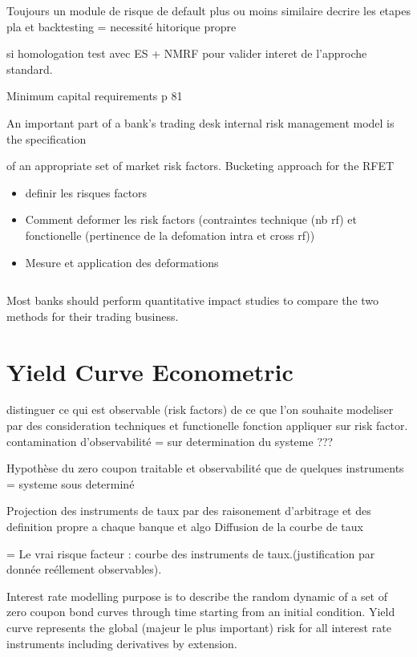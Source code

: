 \documentclass[3pt]{article}
\begin{document}
\bigskip

Toujours un module de risque de default plus ou moins similaire decrire les
etapes pla et backtesting =\TEXTsymbol{>} necessit\'{e} hitorique propre

si homologation test avec ES + NMRF pour valider interet de l'approche
standard.

\bigskip

\bigskip Minimum capital requirements p 81

An important part of a bank's trading desk internal risk management model is
the specification

of an appropriate set of market risk factors. Bucketing approach for the RFET

\begin{itemize}
\item definir les risques factors

\item Comment deformer les risk factors (contraintes technique (nb rf) et
fonctionelle (pertinence de la defomation intra et cross rf))

\item Mesure et application des deformations
\end{itemize}

$\ \ \ \ \ $

Most banks should perform quantitative impact studies to compare the two
methods for their trading business.

\section{Yield Curve Econometric}

\bigskip distinguer ce qui est observable (risk factors) de ce que l'on
souhaite modeliser par des consideration techniques et functionelle fonction
appliquer sur risk factor. contamination d'observabilit\'{e} =\TEXTsymbol{>}
sur determination du systeme ???

Hypoth\`{e}se du zero coupon traitable et observabilit\'{e} que de quelques
instruments =\TEXTsymbol{>} systeme sous determin\'{e}

Projection des instruments de taux par des raisonement d'arbitrage et des
definition propre a chaque banque et algo  Diffusion de la courbe de taux

=\TEXTsymbol{>} Le vrai risque facteur : courbe des instruments de
taux.(justification par donn\'{e}e re\'{e}llement observables).

Interest rate modelling purpose is to describe the random dynamic of a set
of zero coupon bond curves through time starting from an initial condition.
Yield curve represents the global (majeur le plus important) risk for all
interest rate instruments including derivatives by extension.
\end{document}
